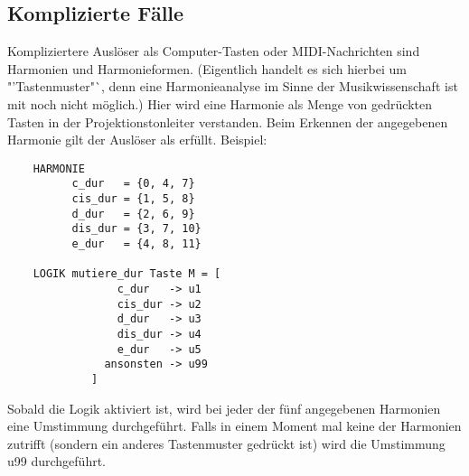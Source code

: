 \subsection{Komplizierte Fälle}\label{sec:komplizierte-falle}

Kompliziertere Auslöser als Computer-Tasten oder MIDI-Nachrichten sind
Harmonien und Harmonieformen. (Eigentlich handelt es sich hierbei um
"'Tastenmuster"`, denn eine Harmonieanalyse im Sinne der
Musikwissenschaft ist mit \mutabor{} noch nicht möglich.) Hier wird
eine Harmonie als Menge von gedrückten Tasten in der
Projektionstonleiter verstanden. Beim Erkennen der angegebenen
Harmonie gilt der Auslöser als erfüllt. Beispiel:
\begin{verbatim}
    HARMONIE 
          c_dur   = {0, 4, 7}
          cis_dur = {1, 5, 8}
          d_dur   = {2, 6, 9}
          dis_dur = {3, 7, 10}
          e_dur   = {4, 8, 11}

    LOGIK mutiere_dur Taste M = [
                 c_dur   -> u1
                 cis_dur -> u2
                 d_dur   -> u3
                 dis_dur -> u4
                 e_dur   -> u5
               ansonsten -> u99
             ]
\end{verbatim}
Sobald die Logik  aktiviert ist, wird
bei jeder der fünf angegebenen Harmonien eine Umstimmung
durchgeführt. Falls in einem Moment mal keine der Harmonien
zutrifft (sondern ein anderes Tastenmuster gedrückt ist)
 wird die Umstimmung u99 durchgeführt.

